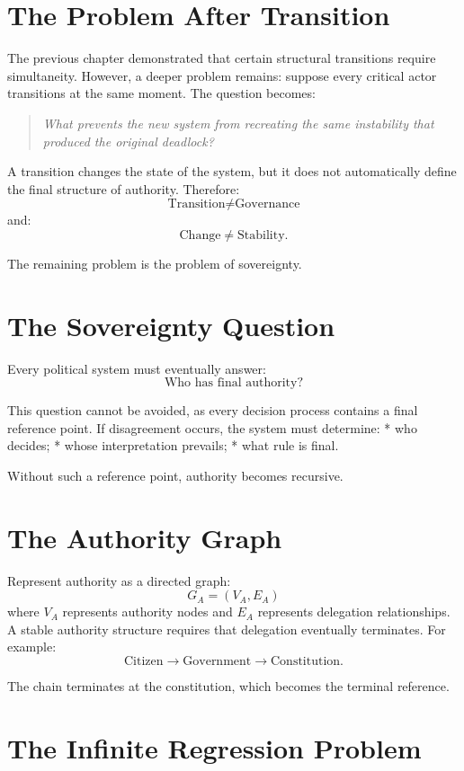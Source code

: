 \documentclass[11pt,openany]{book}
\theoremstyle{plain}
\theoremstyle{definition}
\begin{document}
\section*{The Problem After Transition}

The previous chapter demonstrated that certain structural transitions require simultaneity. However, a deeper problem remains: suppose every critical actor transitions at the same moment. The question becomes:
\begin{quote}
\textit{What prevents the new system from recreating the same instability that produced the original deadlock?}
\end{quote}

A transition changes the state of the system, but it does not automatically define the final structure of authority. Therefore:
\[
\text{Transition} \neq \text{Governance}
\]
and:
\[
\text{Change} \neq \text{Stability}.
\]

The remaining problem is the problem of sovereignty.

\section*{The Sovereignty Question}

Every political system must eventually answer:
\[
\boxed{
\text{Who has final authority?}
}
\]

This question cannot be avoided, as every decision process contains a final reference point. If disagreement occurs, the system must determine:
* who decides;
* whose interpretation prevails;
* what rule is final.

Without such a reference point, authority becomes recursive.

\section*{The Authority Graph}

Represent authority as a directed graph:
\[
G_A = (V_A, E_A)
\]
where \(V_A\) represents authority nodes and \(E_A\) represents delegation relationships. A stable authority structure requires that delegation eventually terminates. For example:
\[
\text{Citizen} \longrightarrow \text{Government} \longrightarrow \text{Constitution}.
\]

The chain terminates at the constitution, which becomes the terminal reference.

\section*{The Infinite Regression Problem}
\end{document}
